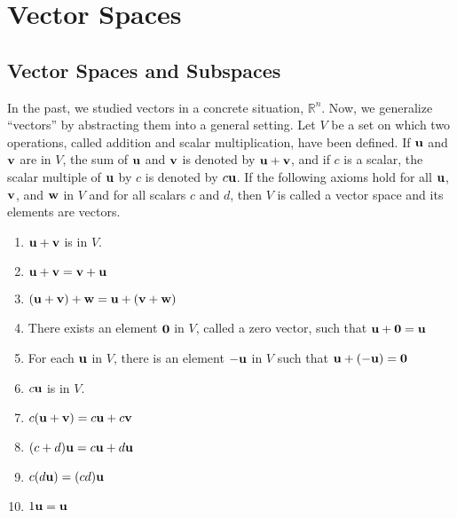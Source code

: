 \documentclass{article}
\begin{document}
    \section{Vector Spaces}
        \subsection{Vector Spaces and Subspaces}
        \begin{outline}
            \1 In the past, we studied vectors in a concrete situation, \(\mathbb R^n\). Now, we generalize ``vectors'' by abstracting them into a general setting. 
            \1 Let $V$ be a set on which two operations, called addition and scalar multiplication, have been defined. If \(\vb u\) and \(\vb v\) are in $V$, the sum of \(\vb u\) and \(\vb v\) is denoted by \(\vb u+\vb v\), and if $c$ is a scalar, the scalar multiple of $\vb u$ by $c$ is denoted by \(c\vb u\). If the following axioms hold for all \(\vb u\), \(\vb v\), and \(\vb w\) in $V$ and for all scalars \(c\) and \(d\), then $V$ is called a vector space and its elements are vectors. 
        \end{outline}
        \begin{enumerate}
            \item \(\vb u+\vb v\) is in $V$. 
            \item \(\vb u+\vb v=\vb v+\vb u\)
            \item \((\vb u+\vb v)+\vb w=\vb u+(\vb v+\vb w)\)
            \item There exists an element $\vb 0$ in $V$, called a zero vector, such that \(\vb u+\vb 0=\vb u\)
            \item For each \(\vb u\) in $V$, there is an element \(-\vb u\) in $V$ such that \(\vb u+(-\vb u)=\vb 0\)
            \item \(c\vb u\) is in $V$. 
            \item \(c(\vb u+\vb v)=c\vb u+c\vb v\)
            \item \((c+d)\vb u=c\vb u+d\vb u\)
            \item \(c(d\vb u)=(cd)\vb u\)
            \item \(1\vb u=\vb u\)
        \end{enumerate}
\end{document}
